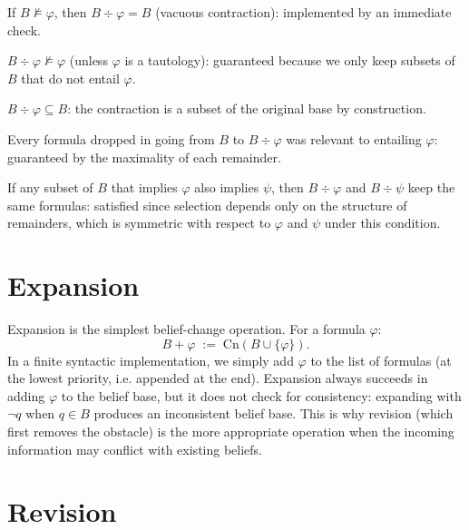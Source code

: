 \documentclass[11pt,a4paper]{article}
\newcommand{\Cn}{\mathrm{Cn}}
\newcommand{\nentails}{\not\models}
\newcommand{\contraction}{\mathbin{\div}}
\newcommand{\expansion}{\mathbin{+}}
\newcommand{\lneg}{\neg}
\begin{document}
\begin{description}[noitemsep,labelwidth=5em]
  \item[Failure] If $B \nentails \varphi$, then $B \contraction \varphi = B$ (vacuous
        contraction): implemented by an immediate check.
  \item[Success] $B \contraction \varphi \nentails \varphi$ (unless $\varphi$ is a
        tautology): guaranteed because we only keep subsets of $B$ that do not
        entail $\varphi$.
  \item[Inclusion] $B \contraction \varphi \subseteq B$: the contraction is a subset
        of the original base by construction.
  \item[Relevance] Every formula dropped in going from $B$ to $B \contraction \varphi$
        was relevant to entailing $\varphi$: guaranteed by the maximality of each
        remainder.
  \item[Uniformity] If any subset of $B$ that implies $\varphi$ also implies $\psi$,
        then $B \contraction \varphi$ and $B \contraction \psi$ keep the same formulas:
        satisfied since selection depends only on the structure of remainders, which is
        symmetric with respect to $\varphi$ and $\psi$ under this condition.
\end{description}

\section{Expansion}

Expansion is the simplest belief-change operation.  For a formula $\varphi$:
\[
  B \expansion \varphi \;:=\; \Cn(B \cup \{\varphi\}).
\]
In a finite syntactic implementation, we simply add $\varphi$ to the list of
formulas (at the lowest priority, i.e. appended at the end).
Expansion always succeeds in adding $\varphi$ to the belief base, but it
does not check for consistency: expanding with $\lneg q$ when $q \in B$
produces an inconsistent belief base.  This is why revision (which first
removes the obstacle) is the more appropriate operation when the incoming
information may conflict with existing beliefs.

\section{Revision}
\end{document}
